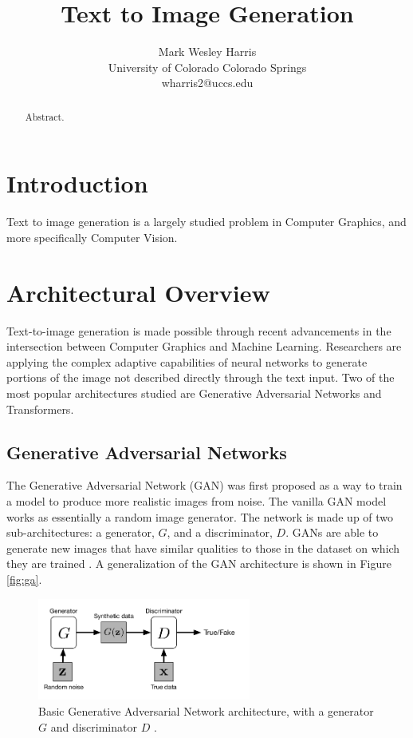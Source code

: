 \documentclass[letterpaper]{article} %
\title{Text to Image Generation}
\author{Mark Wesley Harris\\
University of Colorado Colorado Springs\\
wharris2@uccs.edu
}
\begin{document}
\maketitle

\begin{abstract}
Abstract.
\end{abstract}

\section{Introduction}
\label{sec:introduction}
Text to image generation is a largely studied problem in Computer Graphics, and 
more specifically Computer Vision.

\section{Architectural Overview}
Text-to-image generation is made possible through recent advancements in the 
intersection between Computer Graphics and Machine Learning. Researchers are 
applying the complex adaptive capabilities of neural networks to generate 
portions of the image not described directly through the text input.
Two of the most popular architectures studied are Generative Adversarial 
Networks and Transformers.

\subsection{Generative Adversarial Networks}
The Generative Adversarial Network (GAN)
was first proposed as a way to train a model to produce more realistic images
from noise. The vanilla GAN model works as essentially a random image generator.
The network is made up of two sub-architectures:
a generator, $G$, and a discriminator, $D$.
GANs are able to generate new images that have similar qualities to
those in the dataset on which they are trained
\cite{generative_adversarial_networks}.
A generalization of the GAN architecture is shown in Figure \ref{fig:ga}.

\begin{figure}[htbp]
	\centerline{\includegraphics[width=7cm]{gan.png}}
	\caption{Basic Generative Adversarial Network architecture, with a generator $G$
		and discriminator $D$
		\cite{cgan}.}
	\label{fig:gan}
\end{figure}
\end{document}
